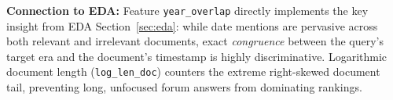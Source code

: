 \textbf{Connection to EDA:} Feature \texttt{year\_overlap} directly implements the key insight from EDA Section~\ref{sec:eda}: while date mentions are pervasive across both relevant and irrelevant documents, exact \textit{congruence} between the query's target era and the document's timestamp is highly discriminative. Logarithmic document length (\texttt{log\_len\_doc}) counters the extreme right-skewed document tail, preventing long, unfocused forum answers from dominating rankings.
